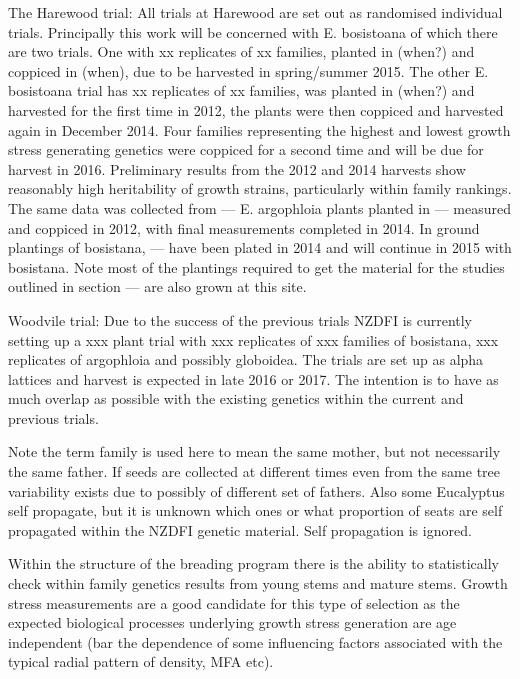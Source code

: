 \documentclass{article}
\begin{document}
The Harewood trial:
All trials at Harewood are set out as randomised individual trials.
Principally this work will be concerned with E. bosistoana of which there are
two trials. One with xx replicates of xx families, planted in (when?) and
coppiced in (when), due to be harvested in spring/summer 2015. The other E. bosistoana
trial has xx replicates of xx families, was planted in (when?) and harvested for
the first time in 2012, the plants were then coppiced and harvested again in
December 2014. Four families representing the highest and lowest growth stress
generating genetics were coppiced for a second time and will be due for harvest
in 2016. Preliminary results from the 2012 and 2014 harvests show reasonably high
heritability  of growth strains, particularly within family rankings. The same
data was collected from --- E. argophloia plants planted in --- measured and
coppiced in 2012, with final measurements completed in 2014.  In ground
plantings of bosistana, --- have been plated in 2014 and will continue in 2015
with bosistana. Note most of the plantings required to get the material for the
studies outlined in section --- are also grown at this site.

Woodvile trial:
Due to the success of the previous trials NZDFI is currently setting up a xxx
plant trial with xxx replicates of xxx families of bosistana, xxx replicates of
argophloia and possibly globoidea. The trials are set up as alpha lattices and
harvest is expected in late 2016 or 2017. The intention is to have as much
overlap as possible with the existing genetics within the current and previous
trials.


Note the term family is used here to mean the same mother, but not necessarily
the same father. If seeds are collected at different times even from the same
tree variability exists due to possibly of different set of fathers. Also some
Eucalyptus self propagate, but it is unknown which ones or what proportion of
seats are self propagated within the NZDFI genetic material. Self propagation
is ignored.

Within the structure of the breading program there is the ability to
statistically check within family genetics results from young stems and mature
stems. Growth stress measurements are a good candidate for this type of
selection as the expected biological processes underlying growth stress
generation are age independent (bar the dependence of some influencing factors
associated with the typical radial pattern of density, MFA etc).
\end{document}
